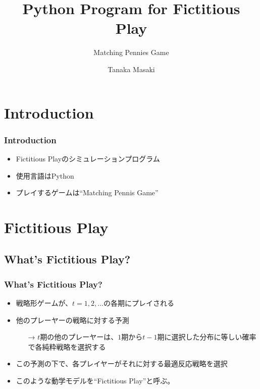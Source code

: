 \documentclass[dvipdfmx,11pt]{beamer}
\title{Python Program for Fictitious Play}
\subtitle{Matching Pennies Game}
\author{Tanaka Masaki}
\institute{The University of Tokyo}
\date{}
\begin{document}
\begin{frame}\frametitle{}
 \maketitle
\end{frame}

\section{Introduction}
\begin{frame}\frametitle{Introduction}
 \begin{itemize}
  \item Fictitious Playのシミュレーションプログラム
  \item 使用言語はPython
  \item プレイするゲームは``Matching Pennis Game''
 \end{itemize}
\end{frame}

\section{Fictitious Play}
\subsection{What's Fictitious Play?}
\begin{frame}\frametitle{What's Fictitious Play?}
 \begin{itemize}
  \item 戦略形ゲームが、$t= 1, 2, \ldots$の各期にプレイされる
  \item 他のプレーヤーの戦略に対する予測
  \begin{itemize}
   \item[→] $t$期の他のプレーヤーは、$1$期から$t-1$期に選択した分布に等しい確率で各純粋戦略を選択する
  \end{itemize}
  \item この予測の下で、各プレイヤーがそれに対する最適反応戦略を選択
  \item このような動学モデルを``Fictitious Play''と呼ぶ。
 \end{itemize}
\end{frame}
\end{document}
